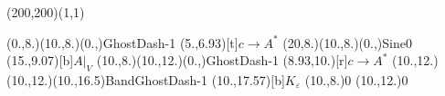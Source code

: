 \unitlength=1bp%

\begin{feynartspicture}(200,200)(1,1)

\FADiagram{}
\FAProp(0.,8.)(10.,8.)(0.,){GhostDash}{-1}
\FALabel(5.,6.93)[t]{$c\to A^*$}
\FAProp(20,8.)(10.,8.)(0.,){Sine}{0}
\FALabel(15.,9.07)[b]{$A|_V$}
\FAProp(10.,8.)(10.,12.)(0.,){GhostDash}{-1}
\FALabel(8.93,10.)[r]{$c\to A^*$}
\FAProp(10.,12.)(10.,12.)(10.,16.5){BandGhostDash}{-1}
\FALabel(10.,17.57)[b]{$K_\varepsilon$}
\FAVert(10.,8.){0}
\FAVert(10.,12.){0}
\end{feynartspicture}

